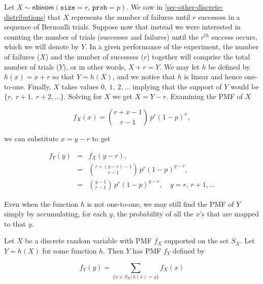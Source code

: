 \documentclass[]{book}
\numberwithin{equation}{chapter}
\numberwithin{figure}{chapter}
\theoremstyle{plain}
\theoremstyle{definition}
\theoremstyle{remark}
\theoremstyle{definition}
\theoremstyle{definition}
\theoremstyle{remark}
\let\BeginKnitrBlock\begin \let\EndKnitrBlock\end
\begin{document}
\bigskip

\BeginKnitrBlock{example}
\protect\hypertarget{ex:unnamed-chunk-246}{}{\label{ex:unnamed-chunk-246}}Let
\(X\sim\mathsf{nbinom}(\mathtt{size}=r,\,\mathtt{prob}=p)\). We saw in
\ref{sec-other-discrete-distributions} that \(X\) represents the number
of failures until \(r\) successes in a sequence of Bernoulli trials.
Suppose now that instead we were interested in counting the number of
trials (successes and failures) until the \(r^{\mathrm{th}}\) success
occurs, which we will denote by \(Y\). In a given performance of the
experiment, the number of failures (\(X\)) and the number of successes
(\(r\)) together will comprise the total number of trials (\(Y\)), or in
other words, \(X+r=Y\). We may let \(h\) be defined by \(h(x)=x+r\) so
that \(Y=h(X)\), and we notice that \(h\) is linear and hence
one-to-one. Finally, \(X\) takes values \(0,\ 1,\ 2,\ldots\) implying
that the support of \(Y\) would be \(\{ r,\ r+1,\ r+2,\ldots \}\).
Solving for \(X\) we get \(X=Y-r\). Examining the PMF of \(X\)

\begin{equation}
f_{X}(x)={r+x-1 \choose r-1}\, p^{r}(1-p)^{x},
\end{equation}

we can substitute \(x = y - r\) to get

\begin{eqnarray*}
f_{Y}(y) & = & f_{X}(y-r),\\
 & = & {r+(y-r)-1 \choose r-1}\, p^{r}(1-p)^{y-r},\\
 & = & {y-1 \choose r-1}\, p^{r}(1-p)^{y-r},\quad y=r,\, r+1,\ldots
\end{eqnarray*}
\EndKnitrBlock{example}

Even when the function \(h\) is not one-to-one, we may still find the
PMF of \(Y\) simply by accumulating, for each \(y\), the probability of
all the \(x\)'s that are mapped to that \(y\).

\bigskip

\BeginKnitrBlock{proposition}
\protect\hypertarget{prp:unnamed-chunk-247}{}{\label{prp:unnamed-chunk-247}}Let
\(X\) be a discrete random variable with PMF \(f_{X}\) supported on the
set \(S_{X}\). Let \(Y=h(X)\) for some function \(h\). Then \(Y\) has
PMF \(f_{Y}\) defined by

\begin{equation}
f_{Y}(y)=\sum_{\{x\in S_{X}|\, h(x)=y\}}f_{X}(x)
\end{equation}
\EndKnitrBlock{proposition}
\end{document}
